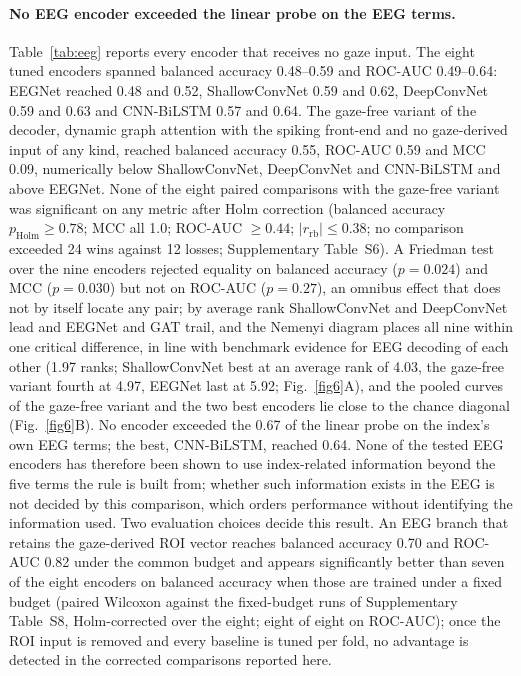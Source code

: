 \paragraph{No EEG encoder exceeded the linear probe on the EEG terms.} Table~\ref{tab:eeg} reports every encoder that receives no gaze input. The eight tuned encoders spanned balanced accuracy 0.48--0.59 and ROC-AUC 0.49--0.64: EEGNet reached 0.48 and 0.52, ShallowConvNet 0.59 and 0.62, DeepConvNet 0.59 and 0.63 and CNN-BiLSTM 0.57 and 0.64. The gaze-free variant of the decoder, dynamic graph attention with the spiking front-end and no gaze-derived input of any kind, reached balanced accuracy 0.55, ROC-AUC 0.59 and MCC 0.09, numerically below ShallowConvNet, DeepConvNet and CNN-BiLSTM and above EEGNet. None of the eight paired comparisons with the gaze-free variant was significant on any metric after Holm correction (balanced accuracy $p_{\mathrm{Holm}}\ge0.78$; MCC all 1.0; ROC-AUC $\ge0.44$; $|r_{\mathrm{rb}}|\le0.38$; no comparison exceeded 24 wins against 12 losses; Supplementary Table~S6). A Friedman test over the nine encoders rejected equality on balanced accuracy ($p=0.024$) and MCC ($p=0.030$) but not on ROC-AUC ($p=0.27$), an omnibus effect that does not by itself locate any pair; by average rank ShallowConvNet and DeepConvNet lead and EEGNet and GAT trail, and the Nemenyi diagram places all nine within one critical difference, in line with benchmark evidence for EEG decoding \cite{ref66} of each other (1.97 ranks; ShallowConvNet best at an average rank of 4.03, the gaze-free variant fourth at 4.97, EEGNet last at 5.92; Fig.~\ref{fig6}A), and the pooled curves of the gaze-free variant and the two best encoders lie close to the chance diagonal (Fig.~\ref{fig6}B). No encoder exceeded the 0.67 of the linear probe on the index's own EEG terms; the best, CNN-BiLSTM, reached 0.64. None of the tested EEG encoders has therefore been shown to use index-related information beyond the five terms the rule is built from; whether such information exists in the EEG is not decided by this comparison, which orders performance without identifying the information used. Two evaluation choices decide this result. An EEG branch that retains the gaze-derived ROI vector reaches balanced accuracy 0.70 and ROC-AUC 0.82 under the common budget and appears significantly better than seven of the eight encoders on balanced accuracy when those are trained under a fixed budget (paired Wilcoxon against the fixed-budget runs of Supplementary Table~S8, Holm-corrected over the eight; eight of eight on ROC-AUC); once the ROI input is removed and every baseline is tuned per fold, no advantage is detected in the corrected comparisons reported here.

